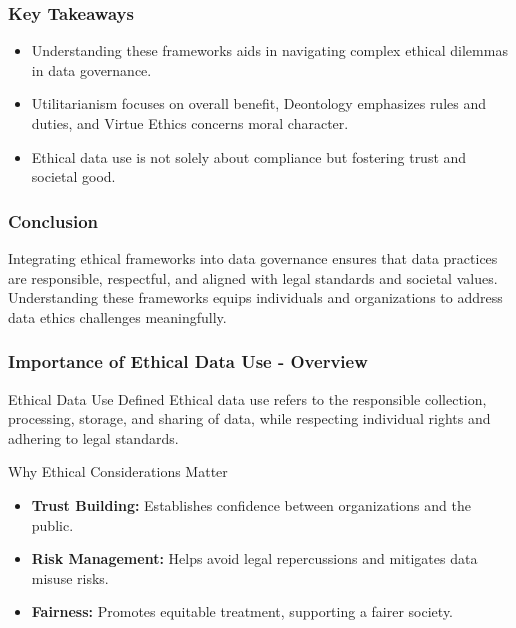 \documentclass[aspectratio=169]{beamer}
\begin{document}
\begin{frame}[fragile]
    \frametitle{Key Takeaways}
    \begin{itemize}
        \item Understanding these frameworks aids in navigating complex ethical dilemmas in data governance.
        \item Utilitarianism focuses on overall benefit, Deontology emphasizes rules and duties, and Virtue Ethics concerns moral character.
        \item Ethical data use is not solely about compliance but fostering trust and societal good.
    \end{itemize}
\end{frame}

\begin{frame}[fragile]
    \frametitle{Conclusion}
    Integrating ethical frameworks into data governance ensures that data practices are responsible, respectful, and aligned with legal standards and societal values. 
    Understanding these frameworks equips individuals and organizations to address data ethics challenges meaningfully.
\end{frame}

\begin{frame}[fragile]
    \frametitle{Importance of Ethical Data Use - Overview}
    \begin{block}{Ethical Data Use Defined}
        Ethical data use refers to the responsible collection, processing, storage, and sharing of data, while respecting individual rights and adhering to legal standards.
    \end{block}
    
    \begin{block}{Why Ethical Considerations Matter}
        \begin{itemize}
            \item \textbf{Trust Building:} Establishes confidence between organizations and the public.
            \item \textbf{Risk Management:} Helps avoid legal repercussions and mitigates data misuse risks.
            \item \textbf{Fairness:} Promotes equitable treatment, supporting a fairer society.
        \end{itemize}
    \end{block}
\end{frame}
\end{document}
